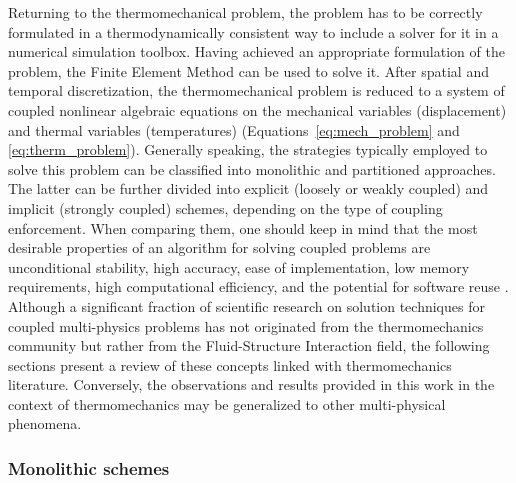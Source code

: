 Returning to the thermomechanical problem, the problem has to be correctly formulated in a thermodynamically consistent way to include a solver for it in a numerical simulation toolbox.
Having achieved an appropriate formulation of the problem, the Finite Element Method can be used to solve it.
After spatial and temporal discretization, the thermomechanical problem is reduced to a system of coupled nonlinear algebraic equations on the mechanical variables (displacement) and thermal variables (temperatures) (Equations~\eqref{eq:mech_problem} and \eqref{eq:therm_problem}).
Generally speaking, the strategies typically employed to solve this problem can be classified into monolithic and partitioned approaches.
The latter can be further divided into explicit (loosely or weakly coupled) and implicit (strongly coupled) schemes, depending on the type of coupling enforcement.
When comparing them, one should keep in mind that the most desirable properties of an algorithm for solving coupled problems are unconditional stability, high accuracy, ease of implementation, low memory requirements, high computational efficiency, and the potential for software reuse \citep{fellipa_partitioned_1988}.
Although a significant fraction of scientific research on solution techniques for coupled multi-physics problems has not originated from the thermomechanics community but rather from the Fluid-Structure Interaction field, the following sections present a review of these concepts linked with thermomechanics literature.
Conversely, the observations and results provided in this work in the context of thermomechanics may be generalized to other multi-physical phenomena.

\subsubsection{Monolithic schemes}
\label{sec:monolithic-schemes}

